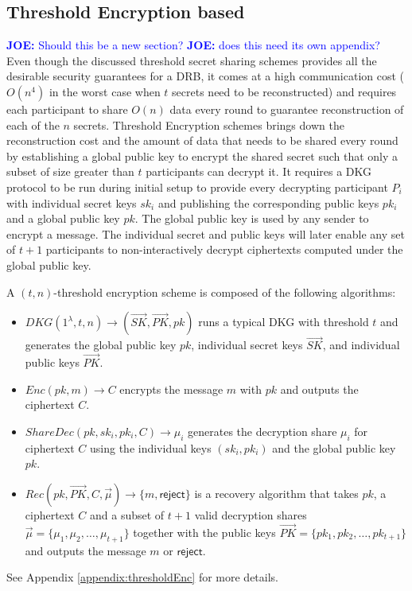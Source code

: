 \documentclass[letterpaper,twocolumn,10pt]{article}
\theoremstyle{definition}
\theoremstyle{remark}
\newcommand{\joenote}[1]{\textcolor{blue}{\textbf{JOE:} #1}}
\begin{document}
\subsection{Threshold Encryption based}
\joenote{Should this be a new section?}
\joenote{does this need its own appendix?}
Even though the discussed threshold secret sharing schemes provides all the desirable security guarantees for a DRB, it comes at a high communication cost ($O(n^4)$ in the worst case when $t$ secrets need to be reconstructed) and requires each participant to share $O(n)$ data every round to guarantee reconstruction of each of the $n$ secrets. Threshold Encryption schemes brings down the reconstruction cost and the amount of data that needs to be shared every round by establishing a global public key to encrypt the shared secret such that only a subset of size greater than $t$ participants can decrypt it. It requires a DKG protocol to be run during initial setup to provide every decrypting participant $P_i$ with individual secret keys $sk_i$ and publishing the corresponding public keys $pk_i$ and a global public key $pk$. The global public key is used by any sender to encrypt a message. The individual secret and public keys will later enable any set of $t + 1$ participants to non-interactively decrypt ciphertexts computed under the global public key. 

A $(t, n)$-threshold encryption scheme is composed of the following algorithms:
\begin{itemize}
    \item $DKG(1^\lambda, t, n) \rightarrow (\vec{SK}, \vec{PK}, pk)$ runs a typical DKG with threshold $t$ and generates the global public key $pk$, individual secret keys $\vec{SK}$, and individual public keys $\vec{PK}$.
    \item $Enc(pk, m) \rightarrow C$ encrypts the message $m$ with $pk$ and outputs the ciphertext $C$.
    \item $ShareDec(pk, sk_i, pk_i, C) \rightarrow \mu_i$ generates the decryption share $\mu_i$ for ciphertext $C$ using the individual keys $(sk_i, pk_i)$ and the global public key $pk$.
    \item $Rec(pk, \vec{PK}, C, \vec{\mu} )\rightarrow \{m, \mathsf{reject}\}$ is a recovery algorithm that takes $pk$, a ciphertext $C$ and a subset of $t+1$ valid decryption shares $\vec{\mu} = \{\mu_1, \mu_2,\ldots, \mu_{t+1}\}$ together with the public keys $\vec{PK} = \{pk_1, pk_2,\ldots, pk_{t+1}\}$ and outputs the message $m$ or $\mathsf{reject}$.
\end{itemize}
See Appendix \ref{appendix:thresholdEnc} for more details.
 
\end{document}
